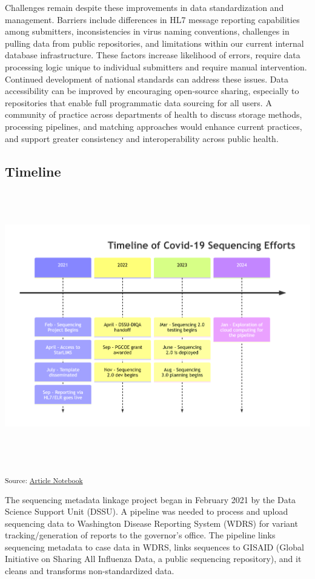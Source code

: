 \documentclass[
]{agujournal2019}
\begin{document}
Challenges remain despite these improvements in data standardization and
management. Barriers include differences in HL7 message reporting
capabilities among submitters, inconsistencies in virus naming
conventions, challenges in pulling data from public repositories, and
limitations within our current internal database infrastructure. These
factors increase likelihood of errors, require data processing logic
unique to individual submitters and require manual intervention.
Continued development of national standards can address these issues.
Data accessibility can be improved by encouraging open-source sharing,
especially to repositories that enable full programmatic data sourcing
for all users. A community of practice across departments of health to
discuss storage methods, processing pipelines, and matching approaches
would enhance current practices, and support greater consistency and
interoperability across public health.

\subsection{Timeline}\label{timeline}

\includegraphics[width=7in,height=4.63in]{index_files/figure-latex/mermaid-figure-13.png}

\textsubscript{Source:
\href{https://NW-PaGe.github.io/sequencing_integration_pipeline1.0/index.qmd.html}{Article
Notebook}}

The sequencing metadata linkage project began in February 2021 by the
Data Science Support Unit (DSSU). A pipeline was needed to process and
upload sequencing data to Washington Disease Reporting System (WDRS) for
variant tracking/generation of reports to the governor's
office\hspace{0pt}. The pipeline links sequencing metadata to case data
in WDRS, links sequences to GISAID (Global Initiative on Sharing All
Influenza Data, a public sequencing repository), and it cleans and
transforms non-standardized data.
\end{document}
